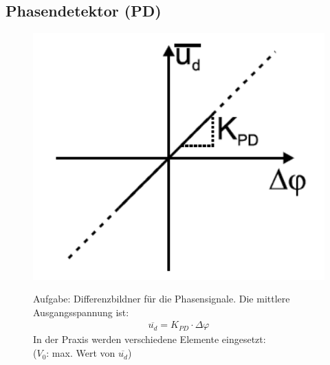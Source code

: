 \subsection{Phasendetektor (PD) }
\label{Kap.VCO}
\vspace{-0.7cm}
\begin{figure}[h!]
	\begin{minipage}{0.2\textwidth} 
       \includegraphics[width=1\textwidth]{images/Phasen_Detekt}
    \vspace{0.2cm}
	\end{minipage}
	\begin{minipage}{0.7\textwidth}
	   Aufgabe: Differenzbildner für die Phasensignale. Die mittlere Ausgangsspannung ist: 
	   \begin{equation*}
         \begin{split}
            \overline{u_d}=K_{PD}\cdot \Delta \varphi
         \end{split}
        \end{equation*}
        In der Praxis werden verschiedene Elemente eingesetzt:  \\  ($V_0$: max. Wert von $\overline{u_d}$)
	\end{minipage}
\end{figure}

